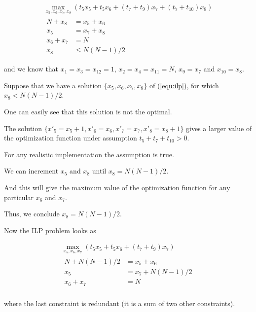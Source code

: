 \documentclass[12pt,a4paper,titlepage,oneside]{article}
\begin{document}
\begin{itemize}
\begin{equation}
\begin{aligned}
\max_{x_5, x_6, x_7, x_8} \left(t_5 x_5 + t_5 x_6 + (t_7+t_9)x_7 + (t_7+t_{10}) x_8 \right)\\
\left.\begin{aligned}
N + x_8 &= x_5 + x_6\\
x_5 &= x_7 + x_8\\
x_6 + x_7 &= N\\
x_8 &\leq N(N-1)/2
\end{aligned}\right.
\end{aligned}
\label{equ:ilp}
\end{equation}

and we know that $x_1 = x_3 = x_{12} = 1$, $x_2 = x_4 = x_{11} = N$, $x_9 = x_7$ and $x_{10} = x_8$.


Suppose that we have a solution $\{x_5, x_6, x_7, x_8\}$ of (\ref{equ:ilp}), for which $x_8 < N(N-1)/2$.

One can easily see that this solution is not the optimal.

The solution $\{x'_5 = x_5+1, x'_6 = x_6, x'_7 = x_7, x'_8 = x_8+1\}$ gives a larger value of the optimization function under assumption $t_5 + t_7 + t_{10} > 0$.

For any realistic implementation the assumption is true.

We can increment $x_5$ and $x_8$ until $x_8 = N(N-1)/2$.

And this will give the maximum value of the optimization function for any particular $x_6$ and $x_7$.

Thus, we conclude $x_8 = N(N-1)/2$.


Now the ILP problem looks as

\begin{equation}
\begin{aligned}
\max_{x_5, x_6, x_7} \left(t_5 x_5 + t_5 x_6 + (t_7+t_9)x_7 \right)\\
\left.\begin{aligned}
N + N(N-1)/2 &= x_5 + x_6\\
x_5 &= x_7 + N(N-1)/2\\
x_6 + x_7 &= N\\
\end{aligned}\right.
\end{aligned}
\label{equ:ilp2}
\end{equation}

where the last constraint is redundant (it is a sum of two other constraints).



\end{itemize}
\end{document}
